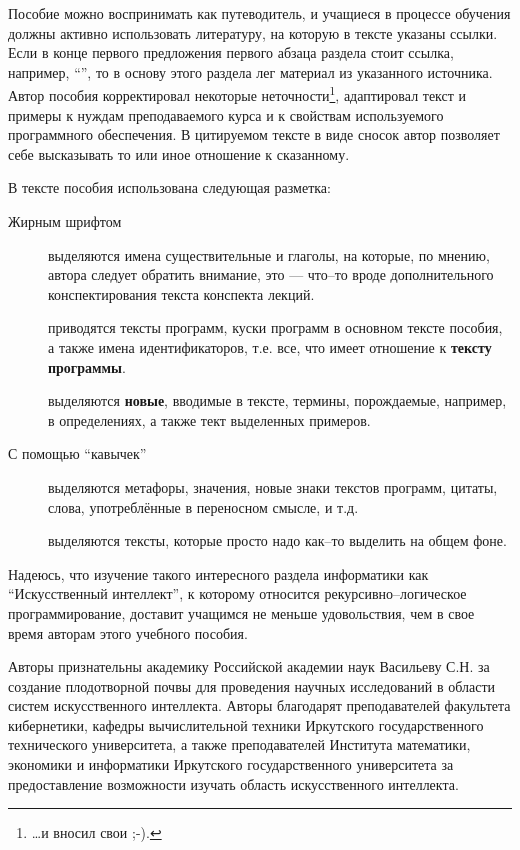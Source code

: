 \documentclass[12pt, openany, twoside]{book} %
\begin{document}
Пособие можно воспринимать как путеводитель, и учащиеся в процессе обучения должны активно использовать литературу, на которую в тексте указаны ссылки. Если в конце первого предложения первого абзаца раздела стоит ссылка, например, ``\cite{AIDictionary}'', то в основу этого раздела лег материал из указанного источника. Автор пособия корректировал некоторые неточности\footnote{\ldots и вносил свои ;-).}, адаптировал текст и примеры к нуждам преподаваемого курса и к свойствам используемого программного обеспечения. В цитируемом тексте в виде сносок автор позволяет себе высказывать то или иное отношение к сказанному.

В тексте пособия использована следующая разметка:
\begin{description}
\item[Жирным шрифтом] выделяются имена существительные и глаголы, на которые, по мнению, автора следует обратить внимание, это --- что--то вроде дополнительного конспектирования текста конспекта лекций.
\item[] приводятся тексты программ, куски программ в основном тексте пособия, а также имена идентификаторов, т.е. все, что имеет отношение к {\bf тексту программы}.
\item[] выделяются {\bf новые}, вводимые в тексте, термины, порождаемые, например, в определениях, а также тект выделенных примеров.
\item[\normalfont С помощью ``кавычек''] выделяются метафоры, значения, новые знаки текстов программ, цитаты, слова,
употреблённые в переносном смысле, и т.д. \item[] вы\-де\-ля\-ю\-тся тексты, которые просто надо как--то выделить на общем фоне.
\end{description}

Надеюсь, что изучение такого интересного раздела информатики как ``Искусственный интеллект'', к которому относится рекурсивно--логическое программирование, доставит учащимся не меньше удовольствия, чем в свое время авторам этого учебного пособия.

Авторы признательны академику Российской академии наук Васильеву С.Н. за создание плодотворной почвы для проведения научных исследований в области систем искусственного интеллекта. Авторы благодарят преподавателей факультета кибернетики, кафедры вычислительной техники Иркутского государственного технического университета, а также преподавателей Института математики, экономики и информатики Иркутского государственного университета за предоставление возможности изучать область искусственного интеллекта.
\end{document}

